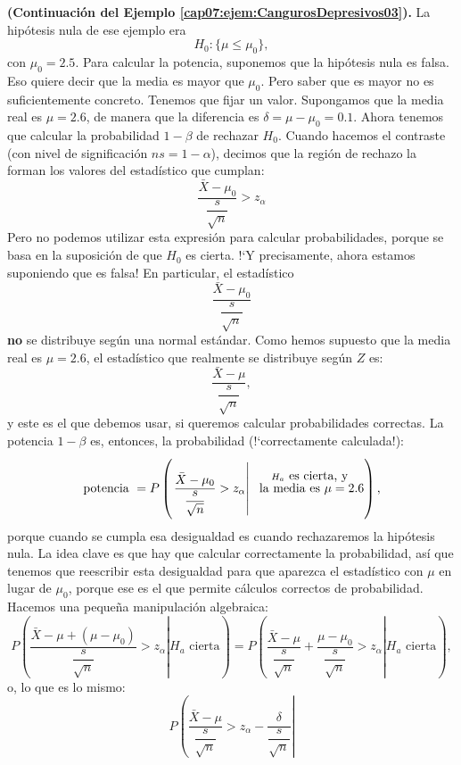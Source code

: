 \begin{ejemplo}{\bf (Continuación del Ejemplo \ref{cap07:ejem:CangurosDepresivos03}).}
\label{cap07:ejem:CalculoPotenciaEjemploCanguros}
    La hipótesis nula de ese ejemplo era
    \[H_0: \{\mu\leq \mu_0\},\]
    con $\mu_0=2.5$. Para calcular la potencia, suponemos que la hipótesis nula es falsa. Eso quiere decir que la media es mayor que $\mu_0$. Pero saber que es mayor no es suficientemente concreto. Tenemos que fijar un valor. Supongamos que la media real es $\mu = 2.6$, de manera que la diferencia es $\delta=\mu-\mu_0=0.1$. Ahora tenemos que calcular la probabilidad $1-\beta$ de rechazar $H_0$. Cuando hacemos el contraste (con nivel de significación $ns=1-\alpha$), decimos que la región de rechazo la forman los valores del estadístico que cumplan:
    \[\dfrac{\bar X-\mu_0}{\dfrac{s}{\sqrt{n}}} > z_{\alpha}\]
    Pero no podemos utilizar esta expresión para calcular probabilidades, porque se basa en la suposición de que $H_0$ es cierta. {!`}Y precisamente, ahora estamos suponiendo que es falsa! En particular, el estadístico
    \[\dfrac{\bar X-\mu_0}{\dfrac{s}{\sqrt{n}}}\]
    {\bf no} se distribuye según una normal estándar. Como hemos supuesto que la media real es $\mu=2.6$, el estadístico que realmente se distribuye según $Z$ es:
    \[\dfrac{\bar X-\mu}{\dfrac{s}{\sqrt{n}}},\]
    y este es el que debemos usar, si queremos calcular probabilidades correctas. La potencia $1-\beta$ es, entonces, la probabilidad ({!`}correctamente calculada!):
    \[
       \mbox{potencia } =  P\left(\left.\dfrac{\bar X-\mu_0}{\dfrac{s}{\sqrt{n}}} > z_{\alpha}\right|
        \rule{0cm}{1cm}\stackrel{H_a\mbox{ es cierta, y}}{\mbox{ la media es }\mu=2.6}\right),
    \]
    porque cuando se cumpla esa desigualdad es cuando rechazaremos la hipótesis nula. La idea clave es que hay que calcular correctamente la probabilidad, así que tenemos que reescribir esta desigualdad para que aparezca el estadístico con $\mu$ en lugar de $\mu_0$, porque ese es el que permite cálculos correctos de probabilidad. Hacemos una pequeña manipulación algebraica:
        \[
            P\left(\left.\dfrac{\bar X-\mu+(\mu-\mu_0)}{\dfrac{s}{\sqrt{n}}}> z_{\alpha}\right|
            H_a\mbox{ cierta} \right)=
            P\left(\left.
            \dfrac{\bar X-\mu}{\dfrac{s}{\sqrt{n}}}+\dfrac{\mu-\mu_0}{\dfrac{s}{\sqrt{n}}}
            > z_{\alpha}\right|
            H_a\mbox{ cierta}\right)
        ,\]
    o, lo que es lo mismo:
        \[
            P\left(\left.
            \dfrac{\bar X-\mu}{\dfrac{s}{\sqrt{n}}}
            > z_{\alpha}-\dfrac{\delta}{\dfrac{s}{\sqrt{n}}}\right|
\]
\end{ejemplo}
